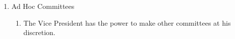 \begin{enumerate}
\begin{enumerate}
		\end{enumerate}

	\item Ad Hoc Committees
		\begin{enumerate}
			\item The Vice President has the power to make other committees at his discretion. \label{adhoccom}
		\end{enumerate}
\end{enumerate}

							

